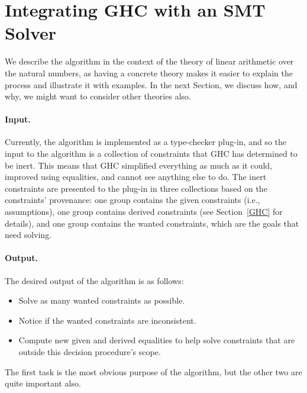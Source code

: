 \documentclass{sigplanconf}
\begin{document}
\section{Integrating GHC with an SMT Solver}
\label{algorithm}

We describe the algorithm in the context of the theory of linear arithmetic
over the natural numbers, as having a concrete theory makes it easier to explain
the process and illustrate it with examples.  In the next Section,
we discuss how, and why, we might want to consider other theories also.

\paragraph{Input.} Currently, the algorithm is implemented as a type-checker
plug-in, and so the input to the algorithm is a collection of constraints
that GHC has determined to be inert. This means that GHC simplified everything
as much as it could, improved using equalities, and cannot see
anything else to do.  The inert constraints are presented to the plug-in
in three collections based on the constraints' provenance: one group contains
the given constraints (i.e., assumptions), one group contains derived
constraints (see Section~\ref{GHC} for details), and one group contains
the wanted constraints, which are the goals that need solving.

\paragraph{Output.} The desired output of the algorithm is as follows:
\begin{itemize}
  \item Solve as many wanted constraints as possible.
  \item Notice if the wanted constraints are inconsistent.
  \item Compute new given and derived equalities to help solve constraints
        that are outside this decision procedure's scope.
\end{itemize}
The first task is the most obvious purpose of the algorithm, but the other
two are quite important also.
\end{document}
